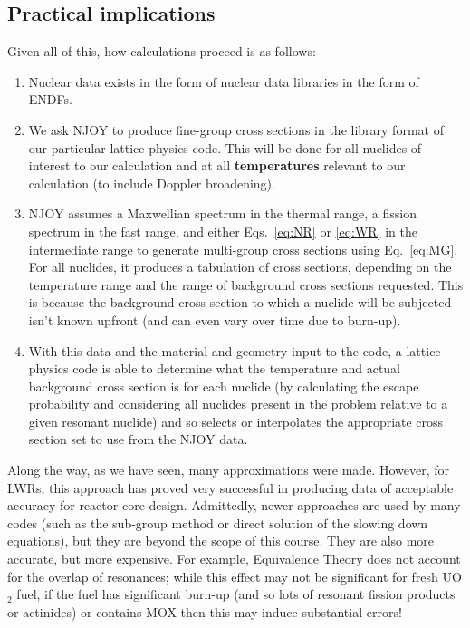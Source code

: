 \documentclass{article}
\begin{document}
\subsection{Practical implications}

Given all of this, how calculations proceed is as follows:

\begin{enumerate}
    \item Nuclear data exists in the form of nuclear data libraries in the form of ENDFs.
    \item We ask NJOY to produce fine-group cross sections in the library format of our particular lattice physics code. This will be done for all nuclides of interest to our calculation and at all \textbf{temperatures} relevant to our calculation (to include Doppler broadening).
    \item NJOY assumes a Maxwellian spectrum in the thermal range, a fission spectrum in the fast range, and either Eqs.~\eqref{eq:NR} or \eqref{eq:WR} in the intermediate range to generate multi-group cross sections using Eq.~\eqref{eq:MG}. For all nuclides, it produces a tabulation of cross sections, depending on the temperature range and the range of background cross sections requested. This is because the background cross section to which a nuclide will be subjected isn't known upfront (and can even vary over time due to burn-up).
    \item With this data and the material and geometry input to the code, a lattice physics code is able to determine what the temperature and actual background cross section is for each nuclide (by calculating the escape probability and considering all nuclides present in the problem relative to a given resonant nuclide) and so selects or interpolates the appropriate cross section set to use from the NJOY data.
\end{enumerate}

Along the way, as we have seen, many approximations were made. However, for LWRs, this approach has proved very successful in producing data of acceptable accuracy for reactor core design. Admittedly, newer approaches are used by many codes (such as the sub-group method or direct solution of the slowing down equations), but they are beyond the scope of this course. They are also more accurate, but more expensive. For example, Equivalence Theory does not account for the overlap of resonances; while this effect may not be significant for fresh UO$_2$ fuel, if the fuel has significant burn-up (and so lots of resonant fission products or actinides) or contains MOX then this may induce substantial errors!
\end{document}
